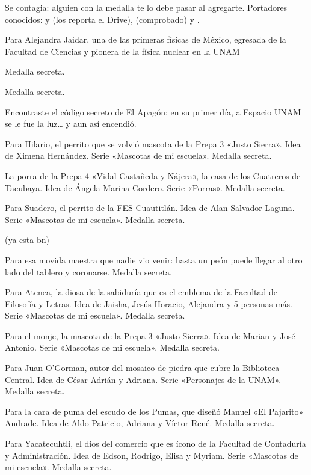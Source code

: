 \begin{description}[leftmargin=1.4cm, style=nextline]
  \item[VIRUS] Se contagia: alguien con la medalla te lo debe pasar al agregarte. Portadores conocidos:  y  (los reporta el Drive),  (comprobado) y .
  \item[J41D4R] Para Alejandra Jaidar, una de las primeras físicas de México, egresada de la Facultad de Ciencias y pionera de la física nuclear en la UNAM
  \item[C4CHORR0] Medalla secreta.
  \item[3R4SM0] Medalla secreta.
  \item[ZOSC9R] Encontraste el código secreto de El Apagón: en su primer día, a Espacio UNAM se le fue la luz… y aun así encendió.
  \item[H1L4R10] Para Hilario, el perrito que se volvió mascota de la Prepa 3 «Justo Sierra». Idea de Ximena Hernández. Serie «Mascotas de mi escuela». Medalla secreta.
  \item[CU4TR3R0S] La porra de la Prepa 4 «Vidal Castañeda y Nájera», la casa de los Cuatreros de Tacubaya. Idea de Ángela Marina Cordero. Serie «Porras». Medalla secreta.
  \item[SU4D3R0] Para Suadero, el perrito de la FES Cuautitlán. Idea de Alan Salvador Laguna. Serie «Mascotas de mi escuela». Medalla secreta.
  \item[OAX4C4] (ya esta bn)
  \item[JUG4D4] Para esa movida maestra que nadie vio venir: hasta un peón puede llegar al otro lado del tablero y coronarse. Medalla secreta.
  \item[4T3N34] Para Atenea, la diosa de la sabiduría que es el emblema de la Facultad de Filosofía y Letras. Idea de Jaisha, Jesús Horacio, Alejandra y 5 personas más. Serie «Mascotas de mi escuela». Medalla secreta.
  \item[M0NJ3] Para el monje, la mascota de la Prepa 3 «Justo Sierra». Idea de Marian y José Antonio. Serie «Mascotas de mi escuela». Medalla secreta.
  \item[0G0RM4N] Para Juan O'Gorman, autor del mosaico de piedra que cubre la Biblioteca Central. Idea de César Adrián y Adriana. Serie «Personajes de la UNAM». Medalla secreta.
  \item[P4J4R1T0] Para la cara de puma del escudo de los Pumas, que diseñó Manuel «El Pajarito» Andrade. Idea de Aldo Patricio, Adriana y Víctor René. Medalla secreta.
  \item[Y4C4FC4] Para Yacatecuhtli, el dios del comercio que es ícono de la Facultad de Contaduría y Administración. Idea de Edson, Rodrigo, Elisa y Myriam. Serie «Mascotas de mi escuela». Medalla secreta.

\end{description}
